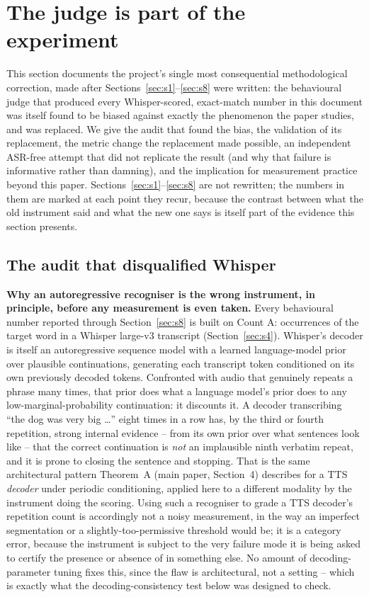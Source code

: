 \documentclass[11pt]{article}
\begin{document}
\section{The judge is part of the experiment}
\label{sec:s9}

This section documents the project's single most consequential
methodological correction, made after Sections~\ref{sec:s1}--\ref{sec:s8}
were written: the behavioural judge that produced every Whisper-scored,
exact-match number in this document was itself found to be biased against
exactly the phenomenon the paper studies, and was replaced. We give the
audit that found the bias, the validation of its replacement, the metric
change the replacement made possible, an independent ASR-free attempt that
did not replicate the result (and why that failure is informative rather
than damning), and the implication for measurement practice beyond this
paper. Sections~\ref{sec:s1}--\ref{sec:s8} are not rewritten; the numbers in
them are marked at each point they recur, because the contrast between what
the old instrument said and what the new one says is itself part of the
evidence this section presents.

\subsection{The audit that disqualified Whisper}
\label{sec:s9-audit}

\textbf{Why an autoregressive recogniser is the wrong instrument, in
principle, before any measurement is even taken.} Every behavioural number
reported through Section~\ref{sec:s8} is built on Count A: occurrences of the
target word in a Whisper large-v3 transcript (Section~\ref{sec:s4}).
Whisper's decoder is itself an autoregressive sequence model with a learned
language-model prior over plausible continuations, generating each
transcript token conditioned on its own previously decoded tokens.
Confronted with audio that genuinely repeats a phrase many times, that prior
does what a language model's prior does to any low-marginal-probability
continuation: it discounts it. A decoder transcribing ``the dog was very big
\ldots{}'' eight times in a row has, by the third or fourth repetition,
strong internal evidence -- from its own prior over what sentences look like
-- that the correct continuation is \emph{not} an implausible ninth verbatim
repeat, and it is prone to closing the sentence and stopping. That is the
same architectural pattern Theorem~A (main paper, Section~4) describes for a
TTS \emph{decoder} under periodic conditioning, applied here to a different
modality by the instrument doing the scoring. Using such a recogniser to
grade a TTS decoder's repetition count is accordingly not a noisy
measurement, in the way an imperfect segmentation or a slightly-too-permissive
threshold would be; it is a category error, because the instrument is
subject to the very failure mode it is being asked to certify the presence
or absence of in something else. No amount of decoding-parameter tuning
fixes this, since the flaw is architectural, not a setting -- which is
exactly what the decoding-consistency test below was designed to check.
\end{document}

